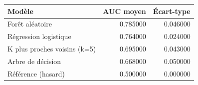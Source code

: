\begin{tabular}{lrr}
\toprule
Modèle & AUC moyen & Écart-type \\
\midrule
Forêt aléatoire & 0.785000 & 0.046000 \\
Régression logistique & 0.764000 & 0.024000 \\
K plus proches voisins (k=5) & 0.695000 & 0.043000 \\
Arbre de décision & 0.668000 & 0.050000 \\
Référence (hasard) & 0.500000 & 0.000000 \\
\bottomrule
\end{tabular}

